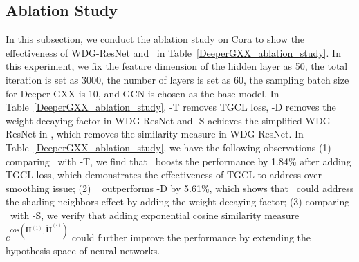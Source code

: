 \subsection{Ablation Study}
\label{deeperGXX_ablation}
In this subsection, we conduct the ablation study on Cora to show the effectiveness of WDG-ResNet and \layer\ in Table~\ref{DeeperGXX_ablation_study}. In this experiment, we fix the feature dimension of the hidden layer as 50, the total iteration is set as 3000, the number of layers is set as 60, the sampling batch size for Deeper-GXX is 10, and GCN is chosen as the base model. In Table~\ref{DeeperGXX_ablation_study}, \name-T removes TGCL loss, \name-D removes the weight decaying factor in WDG-ResNet and \name-S achieves the simplified WDG-ResNet in \name, which removes the similarity measure in WDG-ResNet.
In Table~\ref{DeeperGXX_ablation_study}, we have the following observations (1) comparing \name\ with \name-T, we find that \name\ boosts the performance by 1.84\% after adding TGCL loss, which demonstrates the effectiveness of TGCL to address over-smoothing issue; (2) \name~ outperforms \name-D by 5.61\%, which shows that \name\ could address the shading neighbors effect by adding the weight decaying factor; (3) comparing \name\ with \name-S, we verify that adding exponential cosine similarity measure $ e^{cos(\bm{H}^{(1)}, \bm{\tilde{H}}^{(l)})}$ could further improve the performance by extending the hypothesis space of neural networks.








